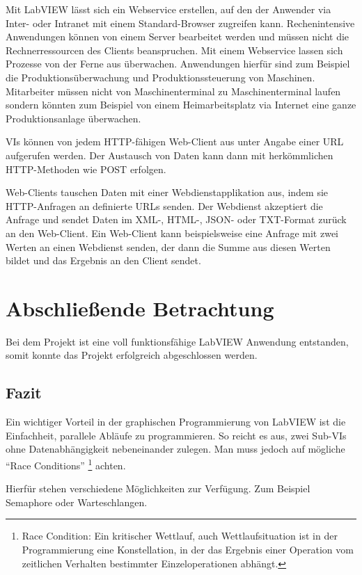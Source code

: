 Mit LabVIEW lässt sich ein Webservice erstellen, auf den der Anwender via Inter- oder Intranet mit einem Standard-Browser zugreifen kann. 
Rechenintensive Anwendungen können von einem Server  bearbeitet werden und müssen nicht die Rechnerressourcen des Clients beanspruchen. 
Mit einem Webservice lassen sich Prozesse von der Ferne aus überwachen. Anwendungen hierfür sind zum Beispiel die Produktionsüberwachung und Produktionssteuerung von Maschinen. Mitarbeiter müssen nicht von Maschinenterminal zu Maschinenterminal laufen sondern könnten zum Beispiel von einem Heimarbeitsplatz via Internet eine ganze Produktionsanlage überwachen.

VIs können von jedem HTTP-fähigen Web-Client aus unter Angabe einer URL  aufgerufen werden. 
Der Austausch von Daten kann dann mit herkömmlichen HTTP-Methoden wie POST erfolgen. 

Web-Clients tauschen Daten mit einer Webdienstapplikation aus, indem sie HTTP-Anfragen an definierte URLs senden. 
Der Webdienst akzeptiert die Anfrage und sendet Daten im XML-, HTML-, JSON- oder TXT-Format zurück an den Web-Client. 
Ein Web-Client kann beispielsweise eine Anfrage mit zwei Werten an einen Webdienst senden, der dann die Summe aus diesen Werten bildet und das Ergebnis an den Client sendet. \cite{LabViewHilfe}





\section{Abschließende Betrachtung}
Bei dem Projekt ist eine voll funktionsfähige LabVIEW Anwendung entstanden, somit konnte das Projekt erfolgreich abgeschlossen werden. 

\subsection{Fazit}
Ein wichtiger Vorteil in der graphischen Programmierung von LabVIEW ist die Einfachheit, parallele Abläufe zu programmieren. 
So reicht es aus, zwei Sub-VIs ohne Datenabhängigkeit nebeneinander zulegen. 
Man muss jedoch auf mögliche "`Race Conditions"'
	\footnote{Race Condition: Ein kritischer Wettlauf, auch Wettlaufsituation ist 	in der Programmierung eine Konstellation, in der das Ergebnis einer Operation vom zeitlichen Verhalten bestimmter Einzeloperationen abhängt.\cite{wiki-RC} } 
achten.



Hierfür stehen verschiedene Möglichkeiten zur Verfügung. 
Zum Beispiel Semaphore oder Warteschlangen. 


